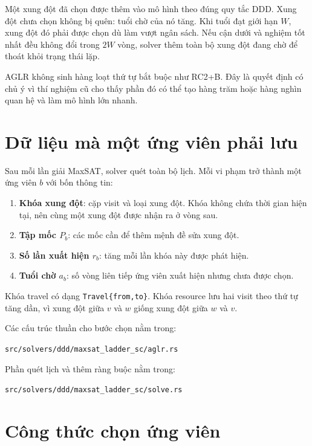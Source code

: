 \documentclass[11pt,a4paper]{article}
\newcommand{\code}[1]{\texttt{#1}}
\newcommand{\file}[1]{\nolinkurl{#1}}
\begin{document}
Một xung đột đã chọn được thêm vào mô hình theo đúng quy tắc DDD. Xung đột chưa
chọn không bị quên: tuổi chờ của nó tăng. Khi tuổi đạt giới hạn $W$, xung đột đó
phải được chọn dù làm vượt ngân sách. Nếu cận dưới và nghiệm tốt nhất đều không
đổi trong $2W$ vòng, solver thêm toàn bộ xung đột đang chờ để thoát khỏi trạng
thái lặp.

AGLR không sinh hàng loạt thứ tự bắt buộc như RC2+B. Đây là quyết định có chủ
ý vì thí nghiệm cũ cho thấy phần đó có thể tạo hàng trăm hoặc hàng nghìn quan hệ
và làm mô hình lớn nhanh.

\section{Dữ liệu mà một ứng viên phải lưu}

Sau mỗi lần giải MaxSAT, solver quét toàn bộ lịch. Mỗi vi phạm trở thành một ứng
viên $b$ với bốn thông tin:

\begin{enumerate}
\item \textbf{Khóa xung đột}: cặp visit và loại xung đột. Khóa không chứa thời
      gian hiện tại, nên cùng một xung đột được nhận ra ở vòng sau.
\item \textbf{Tập mốc $P_b$}: các mốc cần để thêm mệnh đề sửa xung đột.
\item \textbf{Số lần xuất hiện $r_b$}: tăng mỗi lần khóa này được phát hiện.
\item \textbf{Tuổi chờ $a_b$}: số vòng liên tiếp ứng viên xuất hiện nhưng chưa
      được chọn.
\end{enumerate}

Khóa travel có dạng \code{Travel\{from,to\}}. Khóa resource lưu hai visit theo
thứ tự tăng dần, vì xung đột giữa $v$ và $w$ giống xung đột giữa $w$ và $v$.

Các cấu trúc thuần cho bước chọn nằm trong:

\begin{center}
\file{src/solvers/ddd/maxsat_ladder_sc/aglr.rs}
\end{center}

Phần quét lịch và thêm ràng buộc nằm trong:

\begin{center}
\file{src/solvers/ddd/maxsat_ladder_sc/solve.rs}
\end{center}

\section{Công thức chọn ứng viên}
\end{document}
